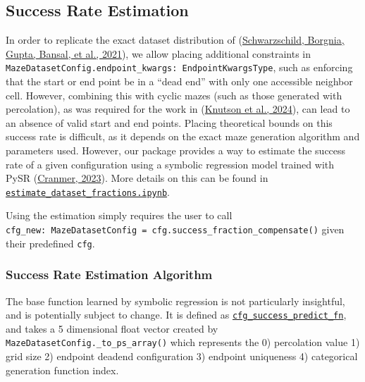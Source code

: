 \documentclass[10pt,a4paper,onecolumn]{article}
\begin{document}
\hypertarget{success-rate-estimation}{%
\subsection{Success Rate Estimation}\label{success-rate-estimation}}

In order to replicate the exact dataset distribution of
(\protect\hyperlink{ref-easy_to_hard}{Schwarzschild, Borgnia, Gupta,
Bansal, et al., 2021}), we allow placing additional constraints in
\texttt{MazeDatasetConfig.endpoint\_kwargs:\ EndpointKwargsType}, such
as enforcing that the start or end point be in a ``dead end'' with only
one accessible neighbor cell. However, combining this with cyclic mazes
(such as those generated with percolation), as was required for the work
in (\protect\hyperlink{ref-knutson2024logicalextrapolation}{Knutson et
al., 2024}), can lead to an absence of valid start and end points.
Placing theoretical bounds on this success rate is difficult, as it
depends on the exact maze generation algorithm and parameters used.
However, our package provides a way to estimate the success rate of a
given configuration using a symbolic regression model trained with PySR
(\protect\hyperlink{ref-pysr}{Cranmer, 2023}). More details on this can
be found in
\href{https://understanding-search.github.io/maze-dataset/notebooks/estimate_dataset_fractions.html}{\texttt{estimate\_dataset\_fractions.ipynb}}.

Using the estimation simply requires the user to call
\texttt{cfg\_new:\ MazeDatasetConfig\ =\ cfg.success\_fraction\_compensate()}
given their predefined \texttt{cfg}.

\hypertarget{success-rate-estimation-algorithm}{%
\subsubsection{Success Rate Estimation
Algorithm}\label{success-rate-estimation-algorithm}}

The base function learned by symbolic regression is not particularly
insightful, and is potentially subject to change. It is defined as
\href{https://understanding-search.github.io/maze-dataset/maze_dataset/dataset/success_predict_math.html\#cfg_success_predict_fn}{\texttt{cfg\_success\_predict\_fn}},
and takes a 5 dimensional float vector created by
\texttt{MazeDatasetConfig.\_to\_ps\_array()} which represents the 0)
percolation value 1) grid size 2) endpoint deadend configuration 3)
endpoint uniqueness 4) categorical generation function index.
\end{document}
